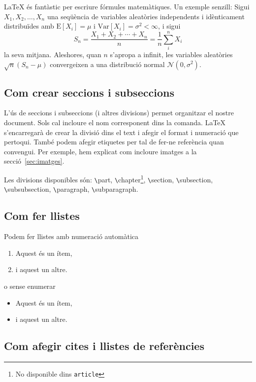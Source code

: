 \documentclass[a4paper]{article}
\newcommand{\comanda}[1][]{\texttt{\textbackslash{}#1}}
\begin{document}
\LaTeX{} és fantàstic per escriure fórmules matemàtiques. Un exemple senzill: Sigui $X_1, X_2, \ldots, X_n$ una seqüència de variables aleatòries independents i idènticament distribuïdes amb $\text{E}[X_i] = \mu$ i $\text{Var}[X_i] = \sigma^2 < \infty$, i sigui
\[S_n = \frac{X_1 + X_2 + \cdots + X_n}{n}
      = \frac{1}{n}\sum_{i}^{n} X_i\]
la seva mitjana. Aleshores, quan $n$ s'apropa a infinit, les variables aleatòries $\sqrt{n}(S_n - \mu)$ convergeixen a una distribució normal $\mathcal{N}(0, \sigma^2)$.

\subsection{Com crear seccions i subseccions}

L'ús de seccions i subseccions (i altres divisions) permet organitzar el nostre document. Sols cal incloure el nom corresponent dins la comanda. \LaTeX{}  s'encarregarà de crear la divisió dins el text i afegir el format i numeració que pertoqui. També podem afegir etiquetes per tal de fer-ne referència quan convengui. Per exemple, hem explicat com incloure imatges a la secció~\ref{sec:imatges}.

Les divisions disponibles són: \comanda{part}, \comanda{chapter}\footnote{No disponible dins \texttt{article}}, \comanda{section}, \comanda{subsection}, \comanda{subsubsection}, \comanda{paragraph}, \comanda{subparagraph}.

\subsection{Com fer llistes}

Podem fer llistes amb numeració automàtica 

\begin{enumerate}
\item Aquest és un ítem,
\item i aquest un altre.
\end{enumerate}

o sense enumerar

\begin{itemize}
\item Aquest és un ítem,
\item i aquest un altre.
\end{itemize}

\subsection{Com afegir cites i llistes de referències}
\end{document}
